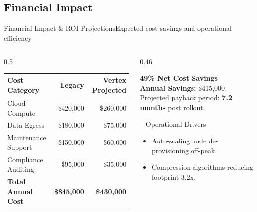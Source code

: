 \documentclass[aspectratio=169, 10pt]{beamer}
\newenvironment{compactitemize}{%
  \begin{itemize}%
    \setlength{\itemsep}{1pt}%
    \setlength{\parskip}{0pt}%
    \setlength{\parsep}{0pt}%
}{%
  \end{itemize}%
}
\begin{document}
\subsection{Financial Impact}
\begin{frame}{Financial Impact \& ROI Projections}{Expected cost savings and operational efficiency}
  \begin{columns}[T]
    \begin{column}{0.5\textwidth}
      \small
      \begin{tabular}{lrr}
        \toprule
        \textbf{Cost Category} & \textbf{Legacy} & \textbf{Vertex Projected} \\
        \midrule
        Cloud Compute & \$420,000 & \$260,000 \\{}
        Data Egress & \$180,000 & \$75,000 \\{}
        Maintenance Support & \$150,000 & \$60,000 \\{}
        Compliance Auditing & \$95,000 & \$35,000 \\
        \midrule
        \textbf{Total Annual Cost} & \textbf{\$845,000} & \textbf{\$430,000} \\
        \bottomrule
      \end{tabular}
    \end{column}

    \begin{column}{0.46\textwidth}
      \begin{tcolorbox}[
        enhanced,
        colback=TealAccent!10,
        colframe=TealAccent,
        arc=6pt,
        top=5pt, bottom=5pt, left=6pt, right=6pt
      ]
        {\large\bfseries\color{TealAccent} 49\% Net Cost Savings}\\[2pt]
        {\small\color{NavyDark}\textbf{Annual Savings:} \$415,000}\\[4pt]
        {\tiny\color{TextMain} Projected payback period: \textbf{7.2 months} post rollout.}
      \end{tcolorbox}
      \vspace*{2pt}
      \begin{featurebox}{\faCoins~ Operational Drivers}
        \tiny
        \begin{compactitemize}
          \item Auto-scaling node de-provisioning off-peak.
          \item Compression algorithms reducing footprint 3.2x.
        \end{compactitemize}
      \end{featurebox}
    \end{column}
  \end{columns}
\end{frame}
\end{document}
